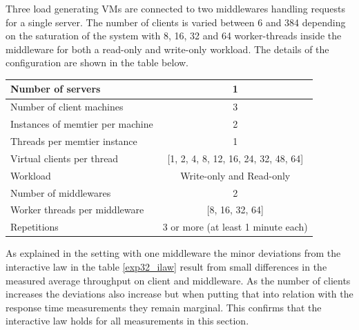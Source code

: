 \documentclass[report.tex]{subfiles}
\begin{document}



Three load generating VMs are connected to two middlewares handling requests for a single server. 
The number of clients is varied between 6 and 384 depending on the saturation of the system with 8, 16, 32 and 64 worker-threads inside the middleware for both a read-only and write-only workload. The details of the configuration are shown in the table below.


\begin{center}
	\scriptsize{
		\begin{tabular}{|l|c|}
			\hline Number of servers                & 1                        \\ 
			\hline Number of client machines        & 3                        \\ 
			\hline Instances of memtier per machine & 2                        \\ 
			\hline Threads per memtier instance     & 1                        \\
			\hline Virtual clients per thread       & [1, 2, 4, 8, 12, 16, 24, 32, 48, 64] \\ 
			\hline Workload                         & Write-only and Read-only \\
			\hline Number of middlewares            & 2                        \\
			\hline Worker threads per middleware    & [8, 16, 32, 64]                  \\
			\hline Repetitions                      & 3 or more (at least 1 minute each)                \\ 
			\hline 
		\end{tabular}
	} 
\end{center}

As explained in the setting with one middleware the minor deviations from the interactive law in the table \ref{exp32_ilaw} result from small differences in the measured average throughput on client and middleware.
As the number of clients increases the deviations also increase but when putting that into relation with the response time measurements they remain marginal. This confirms that the interactive law holds for all measurements in this section.
\end{document}
